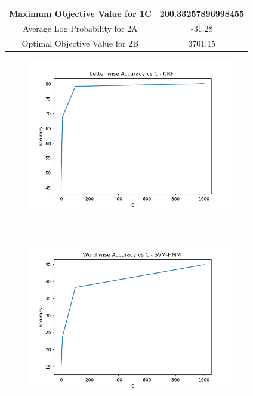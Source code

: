 \documentclass[11pt]{report}
\begin{document}
\begin{center}
\begin{tabular}{ |c|c| } 
 \hline
 Maximum Objective Value for 1C & 200.33257896998455\\
 \hline
 Average Log Probability for 2A & -31.28\\
 \hline
 Optimal Objective Value for 2B & 3701.15\\
 \hline

\end{tabular}
\end{center}

\begin{figure}[t!]
\begin{minipage}[b]{0.50\textwidth} 
\centering 	
\vspace{-0.6em} 
\includegraphics[width=9cm]{CRF_letter_wise.png}
\vspace{0.6em} 
\end{minipage} 
~~~ 
\begin{minipage}[b]{0.50\textwidth} 
\centering 	
\vspace{-0.6em} 
\includegraphics[width=9cm]{SVM-HMM_word_wise.png}
\vspace{0.6em} 
\end{minipage} 
~~~ 
\begin{minipage}[b]{0.50\textwidth} 

\end{minipage}
\end{figure}
\end{document}
